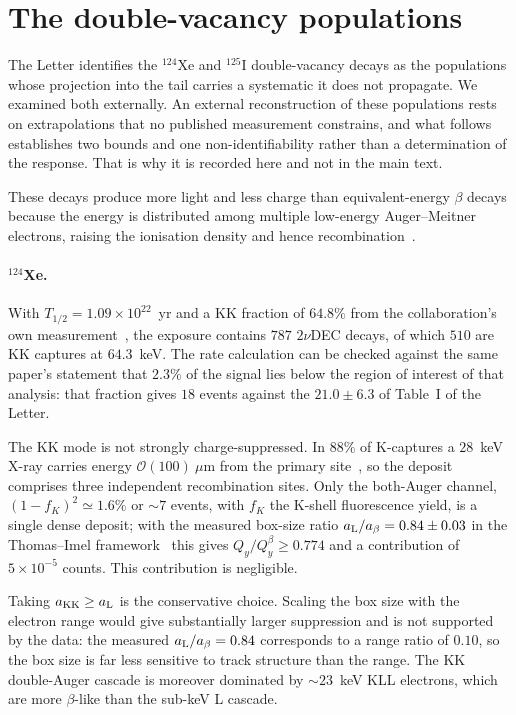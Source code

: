 \documentclass[11pt,a4paper]{article}
\begin{document}
\section{The double-vacancy populations}
\label{sup:dec}

The Letter identifies the \(^{124}\)Xe and \(^{125}\)I double-vacancy
decays as the populations whose projection into the tail carries a
systematic it does not propagate. We examined both externally. An external
reconstruction of these populations rests on extrapolations that no
published measurement constrains, and what follows establishes two bounds
and one non-identifiability rather than a determination of the response.
That is why it is recorded here and not in the main text.

These decays produce more light and less charge than equivalent-energy
\(\beta\) decays because the energy is distributed among multiple
low-energy Auger--Meitner electrons, raising the ionisation density and
hence recombination~\cite{Recomb}.

\paragraph{\(^{124}\)Xe.} With \(T_{1/2}=1.09\times10^{22}\)~yr and a KK
fraction of \(64.8\%\) from the collaboration's own
measurement~\cite{Xe124}, the exposure contains \(787\) \(2\nu\)DEC
decays, of which \(510\) are KK captures at \(64.3\)~keV. The rate
calculation can be checked against the same paper's statement that
\(2.3\%\) of the signal lies below the region of interest of that
analysis: that fraction gives \(18\) events against the \(21.0\pm6.3\) of
Table~I of the Letter.

The KK mode is not strongly charge-suppressed. In \(88\%\) of K-captures a
\(28\)~keV X-ray carries energy \(\mathcal{O}(100)~\mu\)m from the primary
site~\cite{Recomb}, so the deposit comprises three independent
recombination sites. Only the both-Auger channel,
\((1-f_K)^2\simeq1.6\%\) or \(\sim\!7\) events, with \(f_K\) the K-shell
fluorescence yield, is a single dense deposit; with the measured box-size
ratio \(a_{\rm L}/a_\beta=0.84\pm0.03\) in the Thomas--Imel
framework~\cite{ThomasImel,Recomb} this gives
\(Q_y/Q_y^\beta\geq0.774\) and a contribution of \(5\times10^{-5}\)
counts. This contribution is negligible.

Taking \(a_{\rm KK}\geq a_{\rm L}\) is the conservative choice. Scaling
the box size with the electron range would give substantially larger
suppression and is not supported by the data: the measured
\(a_{\rm L}/a_\beta=0.84\) corresponds to a range ratio of \(0.10\), so
the box size is far less sensitive to track structure than the range. The
KK double-Auger cascade is moreover dominated by \(\sim\!23\)~keV KLL
electrons, which are more \(\beta\)-like than the sub-keV L cascade.
\end{document}
